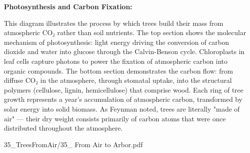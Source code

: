 \begin{SideNotePage}{
  \textbf{Photosynthesis and Carbon Fixation:} \par
  This diagram illustrates the process by which trees build their mass from atmospheric CO₂ rather than soil nutrients. The top section shows the molecular mechanism of photosynthesis: light energy driving the conversion of carbon dioxide and water into glucose through the Calvin-Benson cycle. Chloroplasts in leaf cells capture photons to power the fixation of atmospheric carbon into organic compounds. The bottom section demonstrates the carbon flow: from diffuse CO₂ in the atmosphere, through stomatal uptake, into the structural polymers (cellulose, lignin, hemicellulose) that comprise wood. Each ring of tree growth represents a year's accumulation of atmospheric carbon, transformed by solar energy into solid biomass. As Feynman noted, trees are literally "made of air" — their dry weight consists primarily of carbon atoms that were once distributed throughout the atmosphere.
}{35_TreesFromAir/35_ From Air to Arbor.pdf}
\end{SideNotePage}